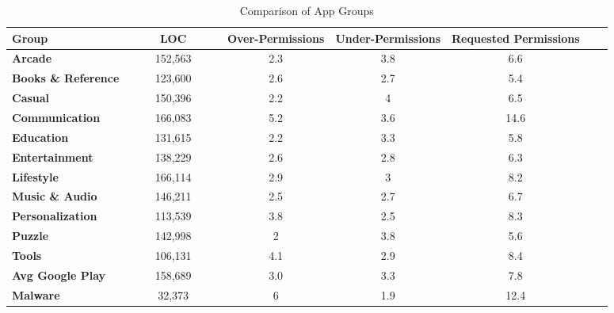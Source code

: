 \documentclass{sig-alternate-05-2015}
\begin{document}
\begin{table*}[]
\begin{center}
\caption{Comparison of App Groups}
\label{Table:topGroups}
 \begin{tabular}{ | l | c | c | c | c | c |  c |} \hline

  \bfseries Group & \bfseries ~~~~ LOC ~~~~  & \bfseries Over-Permissions & \bfseries Under-Permissions & \bfseries Requested Permissions \\ \hline


 	\bfseries Arcade &	152,563	  &	2.3 &	3.8 &	6.6 \\ \hline
 	\bfseries Books \& Reference &	123,600	  &	2.6 &	2.7 &	5.4 \\ \hline
	\bfseries Casual &	150,396  &	2.2 &	4 &	6.5 \\ \hline
 	\bfseries Communication & 	166,083  &	5.2 &	3.6 &	14.6 \\ \hline
	\bfseries Education &	131,615  &	2.2 &	3.3 &	5.8 \\ \hline
 	\bfseries Entertainment &	138,229  &	2.6 &	2.8 &	6.3 \\ \hline
 	\bfseries Lifestyle &	166,114  &	2.9 &	3 &	8.2 \\ \hline
 	\bfseries Music \& Audio &	146,211	  &	2.5 &	2.7 &	6.7 \\ \hline
  	\bfseries Personalization &	113,539	   &	3.8 &	2.5 &	8.3 \\ \hline
 	\bfseries Puzzle &	142,998  &	2 &	3.8 & 	5.6 \\ \hline
	\bfseries Tools	 & 106,131  &	4.1 &	2.9 &	8.4 \\ \hline \hline

	\bfseries Avg Google Play	 & 158,689  & 3.0 &	3.3 &	7.8 \\ \hline
	\bfseries Malware	 & 32,373  & 6 &	1.9 &	 12.4 \\ \hline



\end{tabular}
\end{center}
\end{table*}
\end{document}
